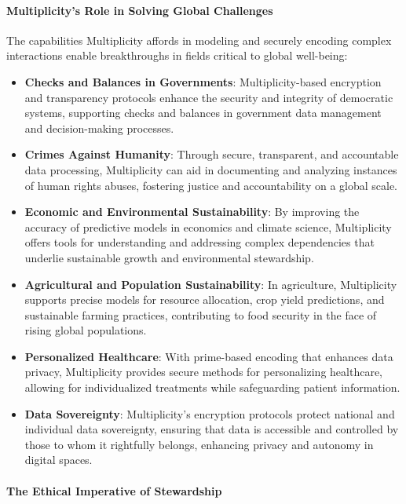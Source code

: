 \documentclass{article}
\begin{document}
\paragraph{Multiplicity's Role in Solving Global Challenges}

The capabilities Multiplicity affords in modeling and securely encoding complex interactions enable breakthroughs in fields critical to global well-being:
\begin{itemize}
    \item \textbf{Checks and Balances in Governments}: Multiplicity-based encryption and transparency protocols enhance the security and integrity of democratic systems, supporting checks and balances in government data management and decision-making processes.
    \item \textbf{Crimes Against Humanity}: Through secure, transparent, and accountable data processing, Multiplicity can aid in documenting and analyzing instances of human rights abuses, fostering justice and accountability on a global scale.
    \item \textbf{Economic and Environmental Sustainability}: By improving the accuracy of predictive models in economics and climate science, Multiplicity offers tools for understanding and addressing complex dependencies that underlie sustainable growth and environmental stewardship.
    \item \textbf{Agricultural and Population Sustainability}: In agriculture, Multiplicity supports precise models for resource allocation, crop yield predictions, and sustainable farming practices, contributing to food security in the face of rising global populations.
    \item \textbf{Personalized Healthcare}: With prime-based encoding that enhances data privacy, Multiplicity provides secure methods for personalizing healthcare, allowing for individualized treatments while safeguarding patient information.
    \item \textbf{Data Sovereignty}: Multiplicity’s encryption protocols protect national and individual data sovereignty, ensuring that data is accessible and controlled by those to whom it rightfully belongs, enhancing privacy and autonomy in digital spaces.
\end{itemize}

\paragraph{The Ethical Imperative of Stewardship}
\end{document}

